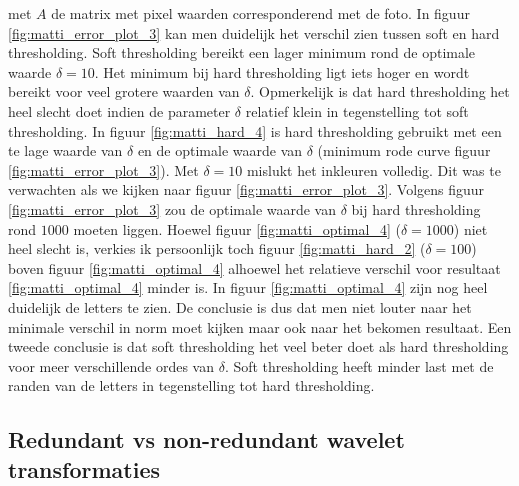 met $A$ de matrix met pixel waarden corresponderend met de foto. In figuur \ref{fig:matti_error_plot_3} kan men duidelijk het verschil zien tussen soft en hard thresholding. Soft thresholding bereikt een lager minimum rond de optimale waarde $\delta = 10$. Het minimum bij hard thresholding ligt iets hoger en wordt bereikt voor veel grotere waarden van $\delta$. Opmerkelijk is dat hard thresholding het heel slecht doet indien de parameter $\delta$ relatief klein in tegenstelling tot soft thresholding. In figuur \ref{fig:matti_hard_4} is hard thresholding gebruikt met een te lage waarde van $\delta$ en de optimale waarde van $\delta$ (minimum rode curve figuur \ref{fig:matti_error_plot_3}). Met $\delta = 10$ mislukt het inkleuren volledig. Dit was te verwachten als we kijken naar figuur \ref{fig:matti_error_plot_3}. Volgens figuur \ref{fig:matti_error_plot_3} zou de optimale waarde van $\delta$ bij hard thresholding rond $1000$ moeten liggen. Hoewel figuur \ref{fig:matti_optimal_4} ($\delta = 1000$)  niet heel slecht is, verkies ik persoonlijk toch figuur \ref{fig:matti_hard_2} ($\delta = 100$) boven figuur \ref{fig:matti_optimal_4} alhoewel het relatieve verschil voor resultaat \ref{fig:matti_optimal_4} minder is. In figuur \ref{fig:matti_optimal_4} zijn nog heel duidelijk de letters te zien. De conclusie is dus dat men niet louter naar het minimale verschil in norm moet kijken maar ook naar het bekomen resultaat. Een tweede conclusie is dat soft thresholding het veel beter doet als hard thresholding voor meer verschillende ordes van $\delta$. Soft thresholding heeft minder last met de randen van de letters in tegenstelling tot hard thresholding.



\subsection{Redundant vs non-redundant wavelet transformaties}

